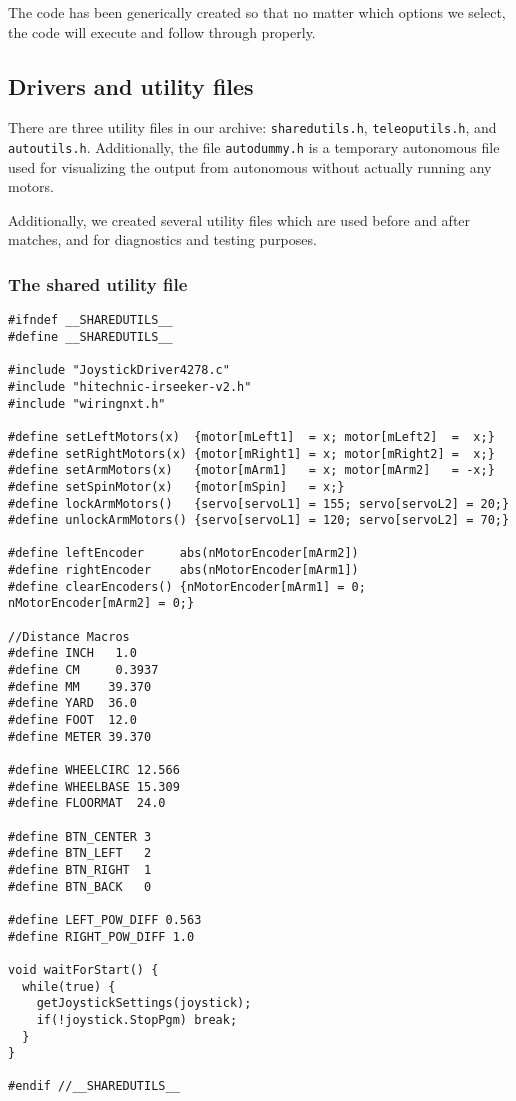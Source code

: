 The code has been generically created so that no matter which options we select, the code will execute and follow through properly.

\subsection{Drivers and utility files}
There are three utility files in our archive: \lstinline{sharedutils.h}, \lstinline{teleoputils.h}, and \lstinline{autoutils.h}. Additionally, the file \lstinline{autodummy.h} is a temporary autonomous file used for visualizing the output from autonomous without actually running any motors.

Additionally, we created several utility files which are used before and after matches, and for diagnostics and testing purposes.

\subsubsection{The shared utility file}
\begin{lstlisting}
#ifndef __SHAREDUTILS__
#define __SHAREDUTILS__

#include "JoystickDriver4278.c"
#include "hitechnic-irseeker-v2.h"
#include "wiringnxt.h"

#define setLeftMotors(x)  {motor[mLeft1]  = x; motor[mLeft2]  =  x;}
#define setRightMotors(x) {motor[mRight1] = x; motor[mRight2] =  x;}
#define setArmMotors(x)   {motor[mArm1]   = x; motor[mArm2]   = -x;}
#define setSpinMotor(x)   {motor[mSpin]   = x;}
#define lockArmMotors()   {servo[servoL1] = 155; servo[servoL2] = 20;}
#define unlockArmMotors() {servo[servoL1] = 120; servo[servoL2] = 70;}

#define leftEncoder     abs(nMotorEncoder[mArm2])
#define rightEncoder    abs(nMotorEncoder[mArm1])
#define clearEncoders() {nMotorEncoder[mArm1] = 0; nMotorEncoder[mArm2] = 0;}

//Distance Macros
#define INCH   1.0
#define CM     0.3937
#define MM    39.370
#define YARD  36.0
#define FOOT  12.0
#define METER 39.370

#define WHEELCIRC 12.566
#define WHEELBASE 15.309
#define FLOORMAT  24.0

#define BTN_CENTER 3
#define BTN_LEFT   2
#define BTN_RIGHT  1
#define BTN_BACK   0

#define LEFT_POW_DIFF 0.563
#define RIGHT_POW_DIFF 1.0

void waitForStart() {
  while(true) {
    getJoystickSettings(joystick);
    if(!joystick.StopPgm) break;
  }
}

#endif //__SHAREDUTILS__
\end{lstlisting}

